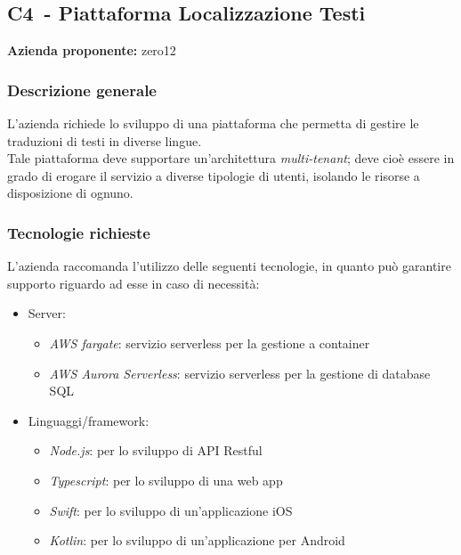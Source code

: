 
\renewcommand{\capName}{Piattaforma Localizzazione Testi} %
\renewcommand{\capCode}{C4} %
\renewcommand{\capLink}{https://www.math.unipd.it/~tullio/IS-1/2022/Progetto/C3.pdf} %
\renewcommand{\capProposer}{zero12} %


\subsection{\capCode\ - \capName}
\textbf{Azienda proponente:} zero12
\subsubsection{Descrizione generale}
L'azienda richiede lo sviluppo di una piattaforma che permetta di gestire le traduzioni di testi in diverse lingue. \\
Tale piattaforma deve supportare un'architettura \textit{multi-tenant}; deve cioè essere in grado di erogare il servizio a diverse tipologie di utenti, isolando le risorse a disposizione di ognuno.

\subsubsection{Tecnologie richieste}
L'azienda raccomanda l'utilizzo delle seguenti tecnologie, in quanto può garantire supporto riguardo ad esse in caso di necessità:
\begin{itemize}
    \item Server:
          \begin{itemize}
              \item \emph{AWS fargate}: servizio serverless per la gestione a container
              \item \emph{AWS Aurora Serverless}: servizio serverless per la gestione di database SQL
          \end{itemize}
    \item Linguaggi/framework:
          \begin{itemize}
              \item \emph{Node.js}: per lo sviluppo di API Restful
              \item \emph{Typescript}: per lo sviluppo di una web app
              \item \emph{Swift}: per lo sviluppo di un'applicazione iOS
              \item \emph{Kotlin}: per lo sviluppo di un'applicazione per Android
          \end{itemize}
\end{itemize}

